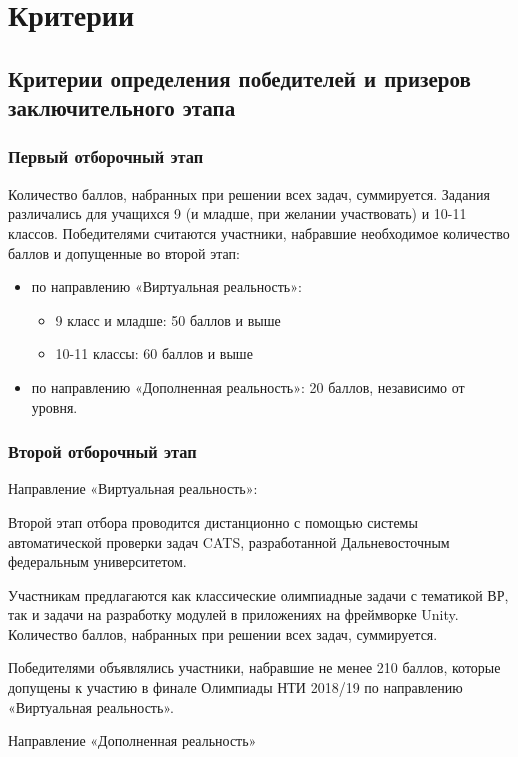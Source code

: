 \part{Критерии}
\chapter{Критерии определения победителей и призеров заключительного этапа}

\section{Первый отборочный этап}
 
Количество баллов, набранных при решении всех задач, суммируется. Задания различались для учащихся 9 (и младше, при желании участвовать) и 10-11 классов. Победителями считаются участники, набравшие необходимое количество баллов и допущенные во второй этап: 
\begin{itemize}
    \item по направлению «Виртуальная реальность»: 
    \begin{itemize}
        \item 9 класс и младше: 50 баллов и выше
        \item 10-11 классы: 60 баллов и выше 
    \end{itemize}
    \item по направлению «Дополненная реальность»: 20 баллов, независимо от уровня.
\end{itemize}

\section{Второй отборочный этап}

Направление «Виртуальная реальность»:

Второй этап отбора проводится дистанционно с помощью системы автоматической проверки задач CATS, разработанной Дальневосточным федеральным университетом.

Участникам предлагаются как классические олимпиадные задачи с тематикой ВР, так и задачи на разработку модулей в приложениях на фреймворке Unity. Количество баллов, набранных при решении всех задач, суммируется.

Победителями объявлялись участники, набравшие не менее 210 баллов, которые допущены к участию в финале Олимпиады НТИ 2018/19 по направлению «Виртуальная реальность».

Направление «Дополненная реальность»

